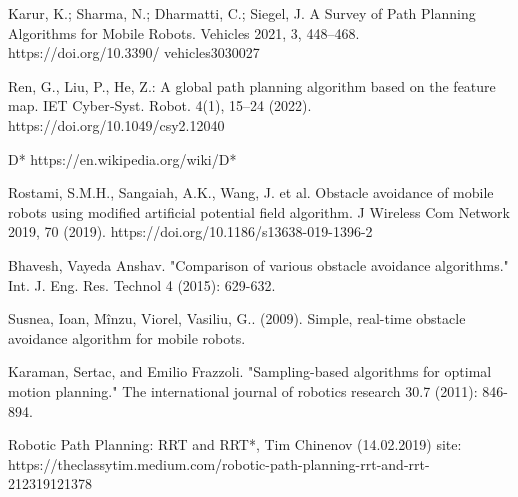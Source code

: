 \documentclass[12pt, a4paper, onecolumn]{article}
\begin{document}
\newpage
\begin{thebibliography}{9}

Karur, K.; Sharma, N.;
Dharmatti, C.; Siegel, J. A Survey of
Path Planning Algorithms for Mobile
Robots. Vehicles 2021, 3, 448–468.
https://doi.org/10.3390/
vehicles3030027

Ren, G., Liu, P., He, Z.: A
global path planning algorithm based on the feature
map. IET Cyber‐Syst. Robot. 4(1), 15–24 (2022).
https://doi.org/10.1049/csy2.12040

D*
https://en.wikipedia.org/wiki/D*

Rostami, S.M.H., Sangaiah, A.K., Wang, J. et al. Obstacle avoidance of mobile robots using modified artificial potential field algorithm. J Wireless Com Network 2019, 70 (2019). https://doi.org/10.1186/s13638-019-1396-2

Bhavesh, Vayeda Anshav. "Comparison of various obstacle avoidance algorithms." Int. J. Eng. Res. Technol 4 (2015): 629-632.

Susnea, Ioan, Mînzu, Viorel, Vasiliu, G.. (2009). Simple, real-time obstacle avoidance algorithm for mobile robots. 

Karaman, Sertac, and Emilio Frazzoli. "Sampling-based algorithms for optimal motion planning." The international journal of robotics research 30.7 (2011): 846-894.

Robotic Path Planning: RRT and RRT*, Tim Chinenov (14.02.2019) site: https://theclassytim.medium.com/robotic-path-planning-rrt-and-rrt-212319121378

\end{thebibliography}
\end{document}
